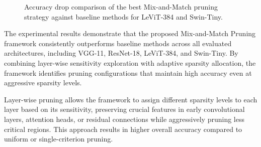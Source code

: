 \documentclass[11pt, conference]{IEEEtran}
\begin{document}
\begin{figure}[!tb]
\centering
{}
\caption{Accuracy drop comparison of the best Mix-and-Match pruning strategy against baseline methods for LeViT-384 and Swin-Tiny.}
\label{fig:levit_swin_bar}
\end{figure}


The experimental results demonstrate that the proposed Mix-and-Match Pruning framework consistently outperforms baseline methods across all evaluated architectures, including VGG-11, ResNet-18, LeViT-384, and Swin-Tiny. By combining layer-wise sensitivity exploration with adaptive sparsity allocation, the framework identifies pruning configurations that maintain high accuracy even at aggressive sparsity levels.

Layer-wise pruning allows the framework to assign different sparsity levels to each layer based on its sensitivity, preserving crucial features in early convolutional layers, attention heads, or residual connections while aggressively pruning less critical regions. This approach results in higher overall accuracy compared to uniform or single-criterion pruning.  
\end{document}
